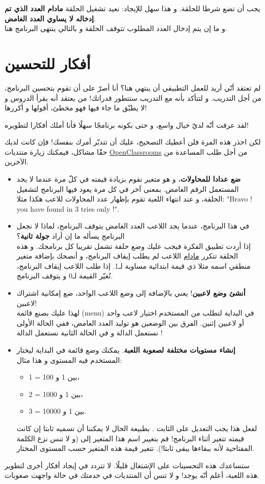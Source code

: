 يجب أن تضع شرطا للحلقة. و هذا سهل للإيجاد: نعيد تشغيل الحلقة 
\textbf{مادام العدد الذي تم إدخاله لا يساوي العدد الغامض}.\\
و ما إن يتم إدخال العدد المطلوب تتوقف الحلقة و بالتالي ينتهى البرنامج هنا.

\section*{أفكار للتحسين}

لم تعتقد أنّي أريد للعمل التطبيقي أن ينتهي هنا؟ أنا أصرّ على أن تقوم بتحسين البرنامج، من أجل التدريب. و لتتأكد بأنه مع التدريب ستتطور قدراتك! من يعتقد أنه يقرأ الدروس و لا يطبّق ما جاء فيها فهو مخطئ، أقولها و أكررها!

لقد عرفت أنّه لديّ خيال واسع، و حتى بكونه برنامجًا سهلًا فأنا أملك أفكارا لتطويره!

لكن احذر هذه المرة فلن أعطيك التصحيح، عليك أن تتدبّر أمرك بنفسك! فإن كانت لديك حقّا مشاكل، فيمكنك زيارة منتديات 
\href{http://www.siteduzero.com/forum-81-126-langage-c.html}{\textenglish{OpenClassrooms}}
من أجل طلب المساعدة من الآخرين.

\begin{itemize}
	\item \textbf{ضع عدادا للمحاولات}،
	و هو متغير نقوم بزيادة قيمته في كلّ مرة عندما لا يجد المستعمل الرقم الغامض. بمعنى آخر في كل مرة يعود فيها البرنامج لتشغيل الحلقة، و عند انتهاء اللعبة تقوم بإظهار عدد المحاولات للاعب هكذا مثلا:
	"\textenglish{Bravo ! you have found in 3 tries only !}".
	\item في هذا البرنامج، عندما يجد اللاعب العدد الغامض يتوقف البرنامج، لماذا لا نجعل البرنامج يسأله ما إن أراد 
	\textbf{جولة ثانية}؟\\
	إذا أردت تطبيق الفكرة فيجب عليك وضع حلقة تشمل تقريبا كل برنامجك. و هذه الحلقة تتكرر 
	\underline{مادام}
	اللاعب لم يطلب إيقاف البرنامج، و أنصحك بإضافة متغير منطقي اسمه مثلا
ذي قيمة ابتدائية مساوية لـ1. إذا طلب اللاعب إيقاف البرنامج، تُغيّر القيمة لـ0 و يتوقف البرنامج.
	\item \textbf{أنشئ وضع لاعبين}!
	 يعني بالإضافة إلى وضع اللاعب الواحد، ضع إمكانية اشتراك لاعبين!\\
	 لهذا عليك بصنع قائمة
	 (\textenglish{menu})
	 في البداية لتطلب من المستخدم اختيار لاعب واحد أو لاعبين إثنين. الفرق بين الوضعين هو توليد العدد الغامض، ففي الحالة الأولى نستعمل الدالة 
	 و في الحالة الثانية نستعمل الدالة
	 !
	 \item \textbf{إنشاء مستويات مختلفة لصعوبة اللعبة}.
	  يمكنك وضع قائمة في البداية ليختار المستخدم فيه المستوى و هذا مثال:
	 \begin{itemize}
	 	\item 1 = بين 1 و 100،
	 	\item 2 = بين 1 و 1000،
	 	\item 3 = بين 1 و 10000.
	 \end{itemize}
 لفعل هذا يجب التعديل على الثابت
 .
 بطبيعة الحال لا يمكننا أن نسميه ثابتا إن كانت قيمته تتغير أثناء البرنامج! قم بتغيير اسم هذا المتغير إلى 
 (و لا تنس نزع الكلمة المفتاحية 
 لأنه ببقاءها يبقى ثابتا!). تتغير قيمة هذه المتغير حسب المستوى المختار.
\end{itemize}

ستساعدك هذه التحسينات على الإشتغال قليلًا. لا تتردد في إيجاد أفكار أخرى لتطوير هذه اللعبة، أعلم أنّه يوجد! و لا تنس أن المنتديات في خدمتك في حالة واجهت صعوبات.
